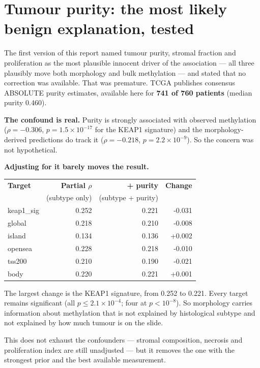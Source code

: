 \documentclass[11pt,a4paper]{article}
\begin{document}
\section{Tumour purity: the most likely benign explanation, tested}

The first version of this report named tumour purity, stromal fraction and proliferation as the
most plausible innocent driver of the association --- all three plausibly move both morphology and
bulk methylation --- and stated that no correction was available. That was premature. TCGA
publishes consensus ABSOLUTE purity estimates, available here for \textbf{741 of 760 patients}
(median purity 0.460).

\textbf{The confound is real.} Purity is strongly associated with observed methylation
($\rho = -0.306$, $p = 1.5\times10^{-17}$ for the KEAP1 signature) and the morphology-derived
predictions do track it ($\rho = -0.218$, $p = 2.2\times10^{-9}$). So the concern was not
hypothetical.

\textbf{Adjusting for it barely moves the result.}

\begin{center}
\begin{tabular}{@{}lrrr@{}}
\toprule
\textbf{Target} & \textbf{Partial $\rho$} & \textbf{+ purity} & \textbf{Change} \\
& (subtype only) & (subtype + purity) & \\
\midrule
keap1\_sig        & 0.252 & 0.221 & -0.031 \\
global             & 0.218 & 0.210 & -0.008 \\
island             & 0.134 & 0.136 & +0.002 \\
opensea            & 0.228 & 0.218 & -0.010 \\
tss200             & 0.210 & 0.190 & -0.021 \\
body               & 0.220 & 0.221 & +0.001 \\
\bottomrule
\end{tabular}
\end{center}

The largest change is the KEAP1 signature, from 0.252 to 0.221. Every target remains significant
(all $p \leq 2.1\times10^{-4}$; four at $p < 10^{-8}$). So morphology carries information about
methylation that is not explained by histological subtype and not explained by how much tumour is
on the slide.

This does not exhaust the confounders --- stromal composition, necrosis and proliferation index are
still unadjusted --- but it removes the one with the strongest prior and the best available
measurement.
\end{document}
